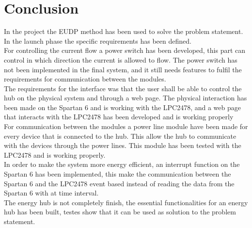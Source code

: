\chapter{Conclusion}
%
In the project the EUDP method has been used to solve the problem statement. In the launch phase the specific requirements has been defined.\\
For controlling the current flow a power switch has been developed, this part can control in which direction the current is allowed to flow. The power switch has not been implemented in the final system, and it still needs features to fulfil the requirements for communication between the modules.\\
The requirements for the interface was that the user shall be able to control the hub on the physical system and through a web page. The physical interaction has been made on the Spartan 6 and is working with the LPC2478, and a web page that interacts with the LPC2478 has been developed and is working properly\\
For communication between the modules a power line module have been made for every device that is connected to the hub. This allow the hub to communicate with the devices through the power lines. This module has been tested with the LPC2478 and is working properly.\\
In order to make the system more energy efficient, an interrupt function on the Spartan 6 has been implemented, this make the communication between the Spartan 6 and the LPC2478 event based instead of reading the data from the Spartan 6 with at time interval.\\
The energy hub is not completely finish, the essential functionalities for an energy hub has been built, testes show that it can be used as solution to the problem statement.

